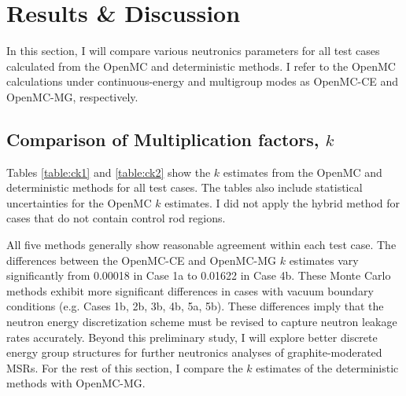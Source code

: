 \section{Results \& Discussion} \label{sec:prelim-results}

In this section, I will compare various neutronics parameters for all test cases calculated from
the OpenMC and deterministic methods. I refer to the OpenMC calculations under continuous-energy
and multigroup modes as OpenMC-CE and OpenMC-MG, respectively.

\subsection{Comparison of Multiplication factors, $k$}

Tables \ref{table:ck1} and \ref{table:ck2} show the $k$ estimates from the OpenMC and deterministic
methods for all test cases. The tables also include statistical uncertainties for the OpenMC
$k$ estimates. I did not apply the hybrid method for cases that do not contain control rod
regions. 

All five methods generally show reasonable agreement within each test case. The differences between
the OpenMC-CE and OpenMC-MG $k$ estimates vary significantly from 0.00018 in Case 1a to 0.01622 in
Case 4b. These Monte Carlo methods exhibit more significant differences in cases
with vacuum boundary conditions (e.g. Cases 1b, 2b, 3b, 4b, 5a, 5b). These differences imply that
the neutron energy discretization scheme must be revised to capture neutron leakage rates
accurately. Beyond this preliminary study, I will explore better discrete energy group structures
for further neutronics analyses of graphite-moderated \glspl{MSR}. For the rest of this
section, I compare the $k$ estimates of the deterministic methods with OpenMC-MG.

